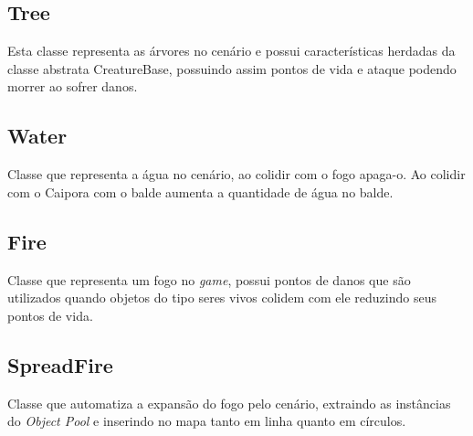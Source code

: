 \subsection{Tree}
Esta classe representa as árvores no cenário e possui características herdadas da classe abstrata CreatureBase, possuindo assim pontos de vida e ataque podendo  morrer ao sofrer danos.


\subsection{Water}
Classe que representa a água no cenário, ao colidir com o fogo apaga-o. Ao colidir com o Caipora com o balde aumenta a quantidade de água no balde.


\subsection{Fire}
Classe que representa um fogo no \textit{game}, possui pontos de danos que são utilizados quando objetos do tipo seres vivos colidem com ele reduzindo seus pontos de vida.


\subsection{SpreadFire}
Classe que automatiza a expansão do fogo pelo cenário, extraindo as instâncias do \textit{Object Pool} e inserindo no mapa tanto em linha quanto em círculos.